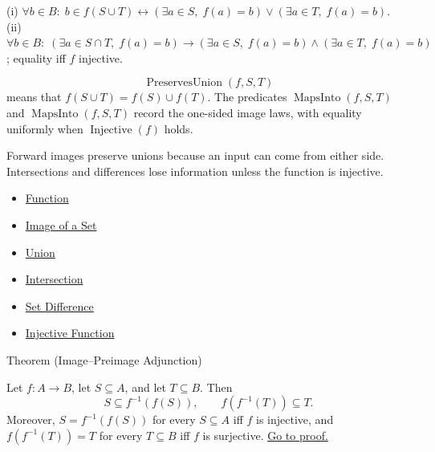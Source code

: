 \begin{remark*}
(i) $\forall b\in B:\; b \in f(S\cup T) \leftrightarrow (\exists a\in S,\; f(a)=b) \vee (\exists a\in T,\; f(a)=b)$.\\
(ii) $\forall b\in B:\; (\exists a\in S\cap T,\; f(a)=b) \to (\exists a\in S,\; f(a)=b) \wedge (\exists a\in T,\; f(a)=b)$; equality iff $f$ injective.
\end{remark*}

\begin{remark*}
\[
  \operatorname{PreservesUnion}(f,S,T)
\] means that $f(S\cup T)=f(S)\cup
f(T)$. The predicates $\operatorname{MapsInto}(f,S,T)$ and
$\operatorname{MapsInto}(f,S,T)$ record the one-sided image
laws, with equality uniformly when $\operatorname{Injective}(f)$ holds.
\end{remark*}

\begin{remark*}[Interpretation]
Forward images preserve unions because an input can come from either side.
Intersections and differences lose information unless the function is
injective.
\end{remark*}

\begin{dependencies}
\begin{itemize}
  \item \hyperref[def:function]{Function}
  \item \hyperref[def:image-set]{Image of a Set}
  \item \hyperref[def:union]{Union}
  \item \hyperref[def:intersection]{Intersection}
  \item \hyperref[def:set-difference]{Set Difference}
  \item \hyperref[def:injective]{Injective Function}
\end{itemize}
\end{dependencies}

\begin{theorembox}{Theorem (Image--Preimage Adjunction)}
\begin{theorem}\label{thm:image-preimage-adjunction}
Let $f:A\to B$, let $S\subseteq A$, and let $T\subseteq B$. Then
\[
S\subseteq f^{-1}(f(S)),
\qquad
f(f^{-1}(T))\subseteq T.
\]
Moreover, $S=f^{-1}(f(S))$ for every $S\subseteq A$ iff $f$ is injective, and
$f(f^{-1}(T))=T$ for every $T\subseteq B$ iff $f$ is surjective.
\hyperref[prf:image-preimage-adjunction]{Go to proof.}
\end{theorem}
\end{theorembox}

